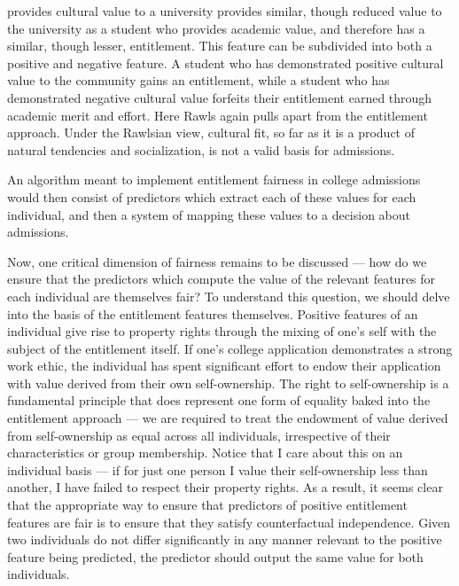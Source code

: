 \begin{itemize}
    provides cultural value to a university provides similar, though reduced
    value to the university as a student who provides academic value, and
    therefore has a similar, though lesser, entitlement. This feature can be
    subdivided into both a positive and negative feature. A student who has 
    demonstrated positive cultural value to the community gains an entitlement,
    while a student who has demonstrated negative cultural value forfeits their
    entitlement earned through academic merit and effort. Here Rawls again pulls
    apart from the entitlement approach. Under the Rawlsian view, cultural fit,
    so far as it is a product of natural tendencies and socialization, is not a
    valid basis for admissions.
\end{itemize}
An algorithm meant to implement entitlement fairness in college admissions
would then consist of predictors which extract each of these values for each
individual, and then a system of mapping these values to a decision about
admissions. 

Now, one critical dimension of fairness remains to be discussed — how do we
ensure that the predictors which compute the value of the relevant features for
each individual are themselves fair? To understand this question, we should
delve into the basis of the entitlement features themselves. Positive features
of an individual give rise to property rights through the mixing of one's self 
with the subject of the entitlement itself. If one's college application
demonstrates a strong work ethic, the individual has spent significant effort to
endow their application with value derived from their own self-ownership. The
right to self-ownership is a fundamental principle that does represent one form
of equality baked into the entitlement approach — we are required to treat the 
endowment of value derived from self-ownership as equal across all individuals,
irrespective of their characteristics or group membership. Notice that I care 
about this on an individual basis — if for just one person I value their
self-ownership less than another, I have failed to respect their property 
rights. As a result, it seems clear that the appropriate way to ensure that 
predictors of positive entitlement features are fair is to ensure that they
satisfy counterfactual independence. Given two individuals do not differ
significantly in any manner relevant to the positive feature being predicted, the
predictor should output the same value for both individuals.

